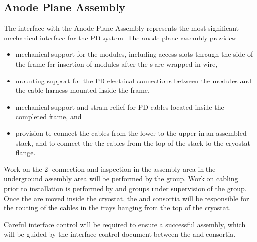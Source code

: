 \subsection{Anode Plane Assembly}

The interface with the Anode Plane Assembly represents the most significant mechanical interface for the PD system.  The anode plane assembly provides:

\begin{itemize}

\item mechanical support for the  modules, including access slots through the side of the frame for insertion of modules after the s are wrapped in wire,

\item mounting support for the PD electrical connections between the  modules and the cable harness mounted inside the  frame,

\item mechanical support and strain relief for PD cables located inside the completed  frame, and

\item provision to connect the  cables from the lower  to the upper  in an assembled  stack, and to connect the the 
cables from the top of the  stack to the cryostat flange.

\end{itemize}

Work on the 2- connection and inspection in the assembly area in the underground assembly area will be performed by the  group. Work on cabling prior to installation is performed by  and  groups under supervision of the  group. Once the  are moved inside the cryostat, the  and  consortia will be responsible for the routing of the cables in the trays hanging from the top of the cryostat. 

Careful interface control will be required to ensure a successful assembly, which will be guided by the interface control document between the  and  consortia.





